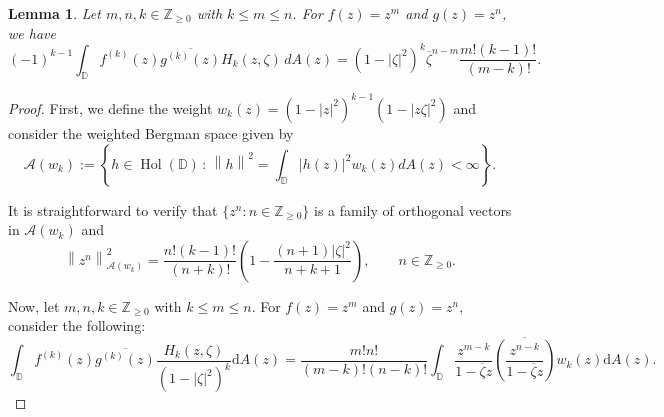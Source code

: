 \documentclass[10pt,oneside,reqno]{amsart}
\newtheorem{lemma}[theorem]{Lemma}
\theoremstyle{definition}
\theoremstyle{remark}
\newcommand{\calA}{{\mathcal{A}}}
\newcommand{\norm}[1]{\left\lVert #1 \right\rVert}
\newcommand{\abs}[1]{\left\lvert #1 \right\rvert}
\renewcommand{\le}{\leqslant}
\renewcommand{\ge}{\geqslant}
\newcommand{\D}{\mathbb D}
\numberwithin{equation}{section}
\begin{document}
 \begin{lemma}\label{lem:H_k-space}
    Let $m, n, k \in \mathbb{Z}_{\ge 0}$ with $k \le m \le n$. For $f(z) = z^m$ and $g(z) = z^n$, we have
    \begin{equation*}
        (-1)^{k-1} \int_{\D} f^{(k)}(z) \overline{g^{(k)}(z)}  H_k(z, \zeta) \, dA(z) =  (1-|\zeta|^2)^{k} \overline{\zeta}^{n-m} \frac{m! (k-1)!}{(m-k)!}.
    \end{equation*}
\end{lemma}

\begin{proof}

    First, we define the weight $w_{k} \left( z \right) = \left( 1-\abs{z}^{2}  \right)^{k-1} \left( 1-\abs{z\zeta}^{2} \right)$ and consider the weighted Bergman space given by 
    \begin{equation*}
        \calA (w_{k}) := \left\{ h \in \operatorname{Hol}\left( \D \right) \, : \, \norm{h}^{2} = \int_{\D} \abs{h\left( z \right)}^{2} w_{k} \left( z \right) dA\left( z \right) < \infty \right\}.
    \end{equation*}

    It is straightforward to verify that $\{z^n: n\in \mathbb Z_{\geqslant 0}\}$ is a family of orthogonal vectors in $ \calA (w_{k})$ and 
    \begin{equation*}
        \norm{z^{n}}_{\calA \left( w_{k} \right)} ^{2} =  \frac{n! (k-1)!}{(n+k)!} \left( 1- \frac{\left( n+1 \right) \abs{\zeta}^{2}}{n+k+1} \right),\qquad n\in \mathbb Z_{\geqslant 0}.
    \end{equation*}

    

    Now, let $m, n, k \in \mathbb{Z}_{\ge 0}$ with $k \le m \le n$. For $f(z) = z^m$ and $g(z) = z^n$, consider the following:
    \begin{equation}
        \int_{\D} f^{(k)}\left( z \right) \overline{g^{(k)} \left( z \right)} \frac{H_{k} \left( z, \zeta \right)}{ ( 1- \abs{\zeta}^{2} )^{k}} \mathrm{d}A\left( z \right)
         =  \frac{m! n!}{(m-k)! (n-k)!} \int_{\D} \frac{z^{m-k}}{1-\overline{\zeta} z} \overline{\left(  \frac{z^{n-k}}{1-\overline{\zeta} z} \right)} w_{k} \left( z \right) \mathrm{d}A \left( z \right).
         \label{eqn:monomial_H_k-1}
    \end{equation}


\end{proof}
\end{document}
